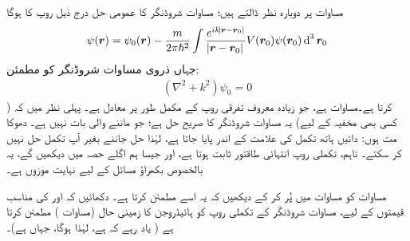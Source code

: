 مساوات پر دوبارہ نظر ڈالتے ہیں؛ مساوات شروڈنگر کا عمومی حل درج ذیل روپ کا ہوگا
\begin{align}\label{مساوات_بکھراو_دوبارہ_نظر}
	\psi(\kvec{r}) = \psi_0(\kvec{r})-\frac{m}{2\pi\hslash^2}\int\frac{e^{ik\abs{\kvec{r}-\kvec{r}_0}}}{\abs{\kvec{r}-\kvec{r}_0}}V(\kvec{r}_0)\psi(\kvec{r}_0)\dif^{\,3}\kvec{r}_0
\end{align}
جہاں   ذروی مساوات شروڈنگر کو مطمئن:
\begin{align}
	(\nabla^2+k^2)\psi_0 = 0
\end{align}
 کرتا ہے۔مساوات   ہے، جو زیادہ معروف تفرقی روپ کے مکمل طور پر معادل ہے۔ پہلی نظر میں  کہ ( کسی بھی مخفیہ کے لیے) یہ مساوات شروڈنگر کا صریح حل ہے؛ جو ماننے والی بات نہیں ہے۔ دھوکا مت ہوں: دائیں ہاتھ تکمل کی علامت کے اندر  پایا جاتا ہے، لہٰذا حل جاننے بغیر آپ تکمل حل نہیں کر سکتے۔ تاہم، تکملی روپ انتہائی طاقتور ثابت ہوتا ہے، اور جیسا ہم اگلے حصہ میں دیکھیں گے، یہ بالخصوص بکھراؤ مسائل کے لیے نہایت موزوں ہے۔

مساوات  کو مساوات  میں پُر کر کے دیکھیں کہ یہ اسے مطمئن کرتا ہے۔
  
دکھائیں کہ  اور  کی مناسب قیمتوں کے لیے، مساوات شروڈنگر کے تکملی روپ کو ہائیڈروجن کا زمینی حال (مساوات ) مطمئن کرتا ہے ( یاد رہے کہ   ہے، لہٰذا  ہوگا، جہاں  ہے)۔



